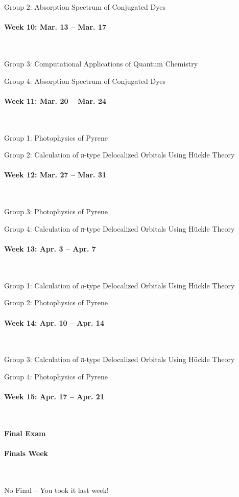 \documentclass[12pt, letterpaper]{article}
\begin{document}
Group 2: Absorption Spectrum of Conjugated Dyes

\paragraph{Week 10: Mar. 13 -- Mar. 17}~

Group 3: Computational Applications of Quantum Chemistry

Group 4: Absorption Spectrum of Conjugated Dyes

\paragraph{Week 11: Mar. 20 -- Mar. 24}~

Group 1: Photophysics of Pyrene

Group 2: Calculation of π-type Delocalized Orbitals Using Hückle Theory

\paragraph{Week 12: Mar. 27 -- Mar. 31}~

Group 3: Photophysics of Pyrene

Group 4: Calculation of π-type Delocalized Orbitals Using Hückle Theory

\paragraph{Week 13: Apr. 3 -- Apr. 7}~

Group 1: Calculation of π-type Delocalized Orbitals Using Hückle Theory

Group 2: Photophysics of Pyrene

\paragraph{Week 14: Apr. 10 -- Apr. 14}~

Group 3: Calculation of π-type Delocalized Orbitals Using Hückle Theory

Group 4: Photophysics of Pyrene

\paragraph{Week 15: Apr. 17 -- Apr. 21}~

\textbf{Final Exam}

\paragraph{Finals Week}~

No Final -- You took it last week!
\end{document}
